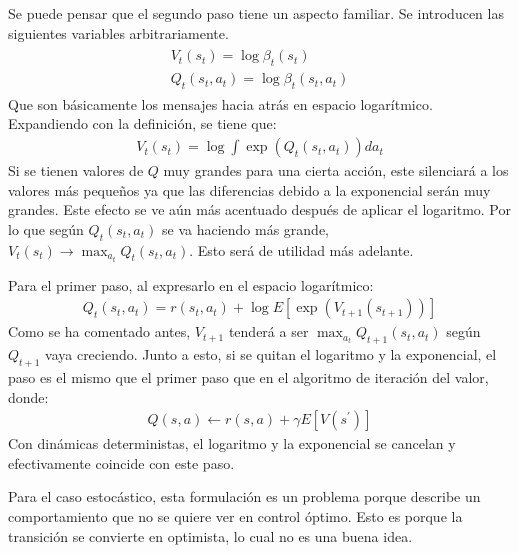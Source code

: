 Se puede pensar que el segundo paso tiene un aspecto familiar. Se introducen las siguientes variables
arbitrariamente.
\begin{align}
\left. \begin{array} { l } { V _ { t } ( s _ { t } ) = \operatorname { log } \beta _ { t } ( s _ { t } ) } \\ { Q _ { t } ( s _ { t } , a _ { t } ) = \operatorname { log } \beta _ { t } ( s _ { t } , a _ { t } ) } \end{array} \right.
\end{align}
Que son básicamente los mensajes hacia atrás en espacio logarítmico. Expandiendo con la
definición, se tiene que:
\begin{align}
V _ { t } ( s _ { t } ) = \operatorname { log } \int \operatorname { exp } ( Q _ { t } ( s _ { t } , a _ { t } ) ) d a _ { t }
\end{align}
Si se tienen valores de $Q$ muy grandes para una cierta acción, este silenciará a los
valores más pequeños ya que las diferencias debido a la exponencial serán muy grandes. Este
efecto se ve aún más acentuado después de aplicar el logaritmo. Por lo que según $Q_t(s_t,a_t)$
se va haciendo más grande, $V_t(s_t)\rightarrow \max_{a_t}Q_t(s_t,a_t)$. Esto será de utilidad
más adelante.

Para el primer paso, al expresarlo en el espacio logarítmico:
\begin{align}
Q _ { t } ( s _ { t } , a _ { t } ) = r ( s _ { t } , a _ { t } ) + \operatorname { log } E [ \operatorname { exp } ( V _ { t + 1 } ( s _ { t + 1 } ) ) ]
\end{align}
Como se ha comentado antes, $V_{t+1}$ tenderá a ser $\max_{a_t}Q_{t+1}(s_t,a_t)$ según
$Q_{t+1}$ vaya creciendo. Junto a esto, si se quitan el logaritmo y la exponencial, el paso
es el mismo que el primer paso que en el algoritmo de iteración del valor, donde:
\begin{align}
Q ( s , a ) \leftarrow r ( s , a ) + \gamma E [ V ( s ^ { \prime } ) ]
\end{align}
Con dinámicas deterministas, el logaritmo y la exponencial se cancelan y efectivamente
coincide con este paso.

Para el caso estocástico, esta formulación es un problema porque describe un comportamiento que
no se quiere ver en control óptimo. Esto es porque la transición se convierte en
optimista, lo cual no es una buena idea.

